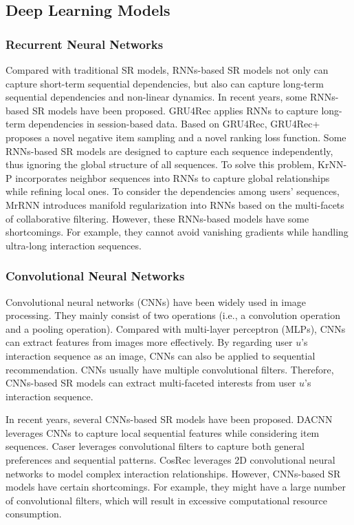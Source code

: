 \documentclass[review]{fcs}
\begin{document}
	\subsection{Deep Learning Models}
	\subsubsection{Recurrent Neural Networks}
	Compared with traditional SR models, RNNs-based SR models not only can capture short-term sequential dependencies, but also can capture long-term sequential dependencies and non-linear dynamics. In recent years, some RNNs-based SR models have been proposed. GRU4Rec \cite{GRU4Rec} applies RNNs to capture long-term dependencies in session-based data. Based on GRU4Rec, GRU4Rec+ \cite{GRU4Rec+} proposes a novel negative item sampling and a novel ranking loss function. Some RNNs-based SR models are designed to capture each sequence independently, thus ignoring the global structure of all sequences. To solve this problem, KrNN-P \cite{KrNN-P} incorporates neighbor sequences into RNNs to capture global relationships while refining local ones. To consider the dependencies among users' sequences, MrRNN \cite{MrRNN} introduces manifold regularization into RNNs based on the multi-facets of collaborative filtering. However, these RNNs-based models have some shortcomings. For example, they cannot avoid vanishing gradients while handling ultra-long interaction sequences.
	\subsubsection{Convolutional Neural Networks}
	Convolutional neural networks (CNNs) have been widely used in image processing. They mainly consist of two operations (i.e., a convolution operation and a pooling operation). Compared with multi-layer perceptron (MLPs), CNNs can extract features from images more effectively. By regarding user $u$’s interaction sequence as an image, CNNs can also be applied to sequential recommendation. CNNs usually have multiple convolutional filters. Therefore, CNNs-based SR models can extract multi-faceted interests from user $u$'s interaction sequence.
	
	In recent years, several CNNs-based SR models have been proposed. DACNN \cite{DACNN} leverages CNNs to capture local sequential features while considering item sequences. Caser \cite{Caser} leverages convolutional filters to capture both general preferences and sequential patterns. CosRec \cite{CosRec} leverages 2D convolutional neural networks to model complex interaction relationships. However, CNNs-based SR models have certain shortcomings. For example, they might have a large number of convolutional filters, which will result in excessive computational resource consumption.
\end{document}
